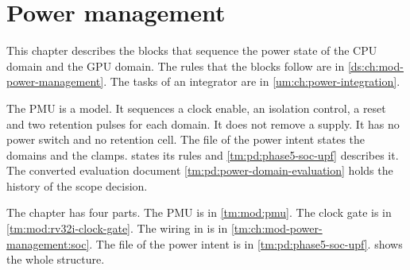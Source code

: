 \chapter{Power management}\label{tm:ch:mod-power-management}

This chapter describes the blocks that sequence the power state of the CPU domain and the GPU domain. The rules that the blocks follow are in \cref{ds:ch:mod-power-management}. The tasks of an integrator are in \cref{um:ch:power-integration}.

The PMU is a model. It sequences a clock enable, an isolation control, a reset and two retention pulses for each domain. It does not remove a supply. It has no power switch and no retention cell. The file of the power intent states the domains and the clamps.  states its rules and \cref{tm:pd:phase5-soc-upf} describes it. The converted evaluation document \cref{tm:pd:power-domain-evaluation} holds the history of the scope decision.

The chapter has four parts. The PMU is in \cref{tm:mod:pmu}. The clock gate is in \cref{tm:mod:rv32i-clock-gate}. The wiring in  is in \cref{tm:ch:mod-power-management:soc}. The file of the power intent is in \cref{tm:pd:phase5-soc-upf}.  shows the whole structure.


